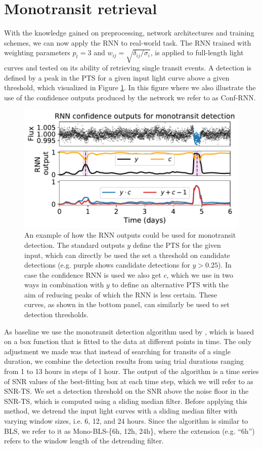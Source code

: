 
\section{Monotransit retrieval}
\label{sec:monos}

With the knowledge gained on preprocessing, network architectures and training schemes, we can now apply the RNN to real-world task. The RNN trained with weighting parameters $p_t=3$ and $w_{ij} = \sqrt{\delta_{ij}/\sigma_i}$, is applied to full-length light curves and tested on its ability of retrieving single transit events. A detection is defined by a peak in the PTS for a given input light curve above a given threshold, which visualized in Figure \ref{fig:mono_example}. In this figure where we also illustrate the use of the confidence outputs produced by the network we refer to as Conf-RNN. 

\begin{figure}
    \centering
    \includegraphics[width=0.5\linewidth]{Experiments/Figures/Monos/mono_example.pdf}
    \caption{An example of how the RNN outputs could be used for monotransit detection. The standard outputs $y$ define the PTS for the given input, which can directly be used the set a threshold on candidate detections (e.g. purple shows candidate detections for $y >0.25$). In case the confidence RNN is used we also get $c$, which we use in two ways in combination with $y$ to define an alternative PTS with the aim of reducing peaks of which the RNN is less certain. These curves, as shown in the bottom panel, can similarly be used to set detection thresholds.}
    \label{fig:mono_example}
\end{figure}

As baseline we use the monotransit detection algorithm used by \cite{foreman2016population}, which is based on a box function that is fitted to the data at different points in time. The only adjustment we made was that instead of searching for transits of a single duration, we combine the detection results from using trial durations ranging from 1 to 13 hours in steps of 1 hour. The output of the algorithm is a time series of SNR values of the best-fitting box at each time step, which we will refer to as SNR-TS. We set a detection threshold on the SNR above the noise floor in the SNR-TS, which is computed using a sliding median filter. Before applying this method, we detrend the input light curves with a sliding median filter with varying window sizes, i.e. 6, 12, and 24 hours. Since the algorithm is similar to BLS, we refer to it as Mono-BLS-\{6h, 12h, 24h\}, where the extension (e.g. ``6h'') refers to the window length of the detrending filter.

